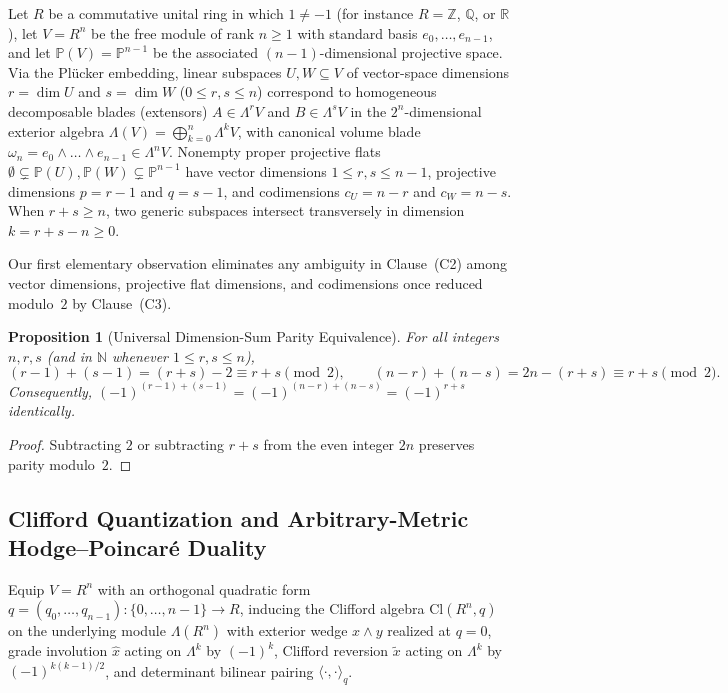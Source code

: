 \documentclass[11pt]{article}
\newtheorem{proposition}[theorem]{Proposition}
\theoremstyle{definition}
\newcommand{\Cl}{\mathrm{Cl}}
\newcommand{\Proj}{\mathbb{P}}
\newcommand{\Z}{\mathbb{Z}}
\newcommand{\Q}{\mathbb{Q}}
\newcommand{\R}{\mathbb{R}}
\begin{document}
Let $R$ be a commutative unital ring in which $1 \neq -1$ (for instance $R = \Z$, $\Q$, or $\R$), let $V = R^n$ be the free module of rank $n \ge 1$ with standard basis $e_0, \dots, e_{n-1}$, and let $\Proj(V) = \Proj^{n-1}$ be the associated $(n-1)$-dimensional projective space. Via the Pl\"ucker embedding, linear subspaces $U, W \subseteq V$ of vector-space dimensions $r = \dim U$ and $s = \dim W$ ($0 \le r, s \le n$) correspond to homogeneous decomposable blades (extensors) $A \in \Lambda^r V$ and $B \in \Lambda^s V$ in the $2^n$-dimensional exterior algebra $\Lambda(V) = \bigoplus_{k=0}^n \Lambda^k V$, with canonical volume blade $\omega_n = e_0 \wedge \dots \wedge e_{n-1} \in \Lambda^n V$. Nonempty proper projective flats $\emptyset \subsetneq \Proj(U), \Proj(W) \subsetneq \Proj^{n-1}$ have vector dimensions $1 \le r, s \le n - 1$, projective dimensions $p = r - 1$ and $q = s - 1$, and codimensions $c_U = n - r$ and $c_W = n - s$. When $r + s \ge n$, two generic subspaces intersect transversely in dimension $k = r + s - n \ge 0$.

Our first elementary observation eliminates any ambiguity in Clause~(C2) among vector dimensions, projective flat dimensions, and codimensions once reduced modulo~$2$ by Clause~(C3).

\begin{proposition}[Universal Dimension-Sum Parity Equivalence]\label{prop:dim-parity}
For all integers $n, r, s$ (and in $\mathbb{N}$ whenever $1 \le r, s \le n$),
\[
(r - 1) + (s - 1) = (r + s) - 2 \equiv r + s \pmod{2}, \qquad
(n - r) + (n - s) = 2n - (r + s) \equiv r + s \pmod{2}.
\]
Consequently, $(-1)^{(r-1)+(s-1)} = (-1)^{(n-r)+(n-s)} = (-1)^{r+s}$ identically.
\end{proposition}
\begin{proof}
Subtracting $2$ or subtracting $r + s$ from the even integer $2n$ preserves parity modulo~$2$.
\end{proof}

\subsection{Clifford Quantization and Arbitrary-Metric Hodge--Poincar\'e Duality}

Equip $V = R^n$ with an orthogonal quadratic form $q = (q_0, \dots, q_{n-1}) : \{0, \dots, n-1\} \to R$, inducing the Clifford algebra $\Cl(R^n, q)$ on the underlying module $\Lambda(R^n)$ with exterior wedge $x \wedge y$ realized at $q = 0$, grade involution $\hat{x}$ acting on $\Lambda^k$ by $(-1)^k$, Clifford reversion $\widetilde{x}$ acting on $\Lambda^k$ by $(-1)^{k(k-1)/2}$, and determinant bilinear pairing $\langle \cdot, \cdot \rangle_q$.
\end{document}
